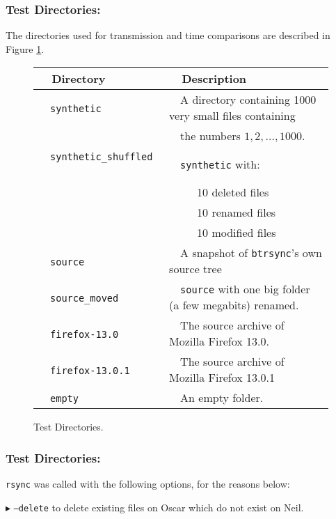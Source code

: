 \documentclass[11pt]{llncs}
\newcommand{\btrsync}{\texttt{btrsync}\xspace}
\newcommand{\rsync}{\texttt{rsync}\xspace}
\begin{document}
\subsubsection{Test Directories:} The directories used for transmission and time comparisons are described in Figure \ref{tab:benchdirec}.\smallskip

\begin{figure}
\begin{center}
\begin{tabular}{ll}\toprule
~~{\bf Directory}              ~~&~~{\bf Description}\\\midrule
~~{\tt synthetic}              ~~&~~A directory containing 1000 very small files containing~~\\
~~                             ~~&~~the numbers $1,2,\ldots,1000$. \\
~~{\tt synthetic\_shuffled}    ~~&~~{\tt synthetic} with:\\
                             ~~& ~~~~~10 deleted files\\
                             ~~& ~~~~~10 renamed files \\
                             ~~& ~~~~~10 modified files \\
~~{\tt source}                 ~~& ~~A snapshot of \btrsync's own source tree \\
~~{\tt source\_moved}          ~~& ~~{\tt source} with one big folder (a few megabits) renamed.~~\\
~~{\tt firefox-13.0}           ~~& ~~The source archive of Mozilla Firefox 13.0.\\
~~{\tt firefox-13.0.1}         ~~& ~~The source archive of Mozilla Firefox 13.0.1\\
~~{\tt empty}                  ~~& ~~An empty folder.\\\bottomrule
\end{tabular}\smallskip
  \caption{Test Directories.}
  \label{tab:benchdirec}
\end{center}
\end{figure}

\subsubsection{Test Directories:} \rsync was called with the following options, for the reasons below:

$\blacktriangleright$ {\tt --delete} to delete existing files on Oscar which do not exist on Neil.\smallskip
\end{document}
